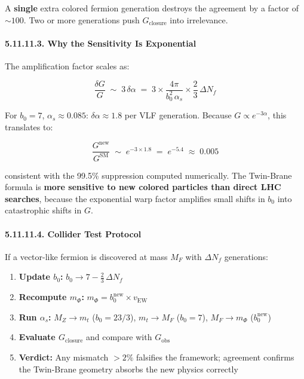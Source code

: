 \documentclass[
  11pt,
]{article}
\providecommand{\tightlist}{%
  \setlength{\itemsep}{0pt}\setlength{\parskip}{0pt}}
\begin{document}
A \textbf{single} extra colored fermion generation destroys the
agreement by a factor of \(\sim 100\). Two or more generations push
\(G_{\text{closure}}\) into irrelevance.

\hypertarget{why-the-sensitivity-is-exponential}{%
\paragraph{5.11.11.3. Why the Sensitivity Is
Exponential}\label{why-the-sensitivity-is-exponential}}

The amplification factor scales as:

\[\frac{\delta G}{G} \;\sim\; 3\,\delta\alpha \;=\; 3 \times \frac{4\pi}{b_0^2\,\alpha_s} \times \frac{2}{3}\,\Delta N_f \tag{266}\]

For \(b_0 = 7\), \(\alpha_s \approx 0.085\):
\(\delta\alpha \approx 1.8\) per VLF generation. Because
\(G \propto e^{-3\alpha}\), this translates to:

\[\frac{G^{\text{new}}}{G^{\text{SM}}} \;\sim\; e^{-3 \times 1.8} \;=\; e^{-5.4} \;\approx\; 0.005 \tag{267}\]

consistent with the 99.5\% suppression computed numerically. The
Twin-Brane formula is \textbf{more sensitive to new colored particles
than direct LHC searches}, because the exponential warp factor amplifies
small shifts in \(b_0\) into catastrophic shifts in \(G\).

\hypertarget{collider-test-protocol}{%
\paragraph{5.11.11.4. Collider Test
Protocol}\label{collider-test-protocol}}

If a vector-like fermion is discovered at mass \(M_F\) with
\(\Delta N_f\) generations:

\begin{enumerate}
\def\labelenumi{\arabic{enumi}.}
\tightlist
\item
  \textbf{Update \(b_0\):} \(b_0 \to 7 - \tfrac{2}{3}\,\Delta N_f\)
\item
  \textbf{Recompute \(m_\Phi\):}
  \(m_\Phi = b_0^{\text{new}} \times v_{\text{EW}}\)
\item
  \textbf{Run \(\alpha_s\):} \(M_Z \to m_t\) (\(b_0 = 23/3\)),
  \(m_t \to M_F\) (\(b_0 = 7\)), \(M_F \to m_\Phi\)
  (\(b_0^{\text{new}}\))
\item
  \textbf{Evaluate \(G_{\text{closure}}\)} and compare with
  \(G_{\text{obs}}\)
\item
  \textbf{Verdict:} Any mismatch \(> 2\%\) falsifies the framework;
  agreement confirms the Twin-Brane geometry absorbs the new physics
  correctly
\end{enumerate}
\end{document}
